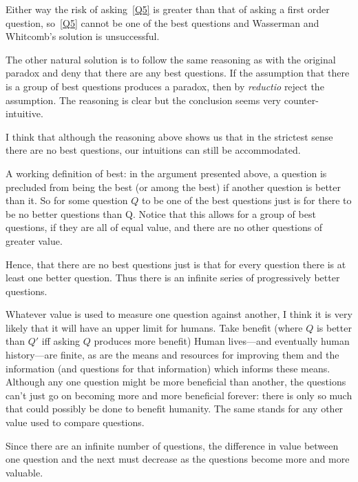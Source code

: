Either way the risk of asking~\ref{Q5} is greater than that of asking a first order question, so~\ref{Q5} cannot be one of the best questions and Wasserman and Whitcomb's solution is unsuccessful.

The other natural solution is to follow the same reasoning as with the original paradox and deny that there are any best questions.
If the assumption that there is a group of best questions produces a paradox, then by \textit{reductio} reject the assumption.
The reasoning is clear but the conclusion seems very counter-intuitive.

I think that although the reasoning above shows us that in the strictest sense there are no best questions, our intuitions can still be accommodated.

A working definition of best: in the argument presented above, a question is precluded from being the best (or among the best) if another question is better than it.
So for some question $Q$ to be one of the best questions just is for there to be no better questions than Q.
Notice that this allows for a group of best questions, if they are all of equal value, and there are no other questions of greater value.

Hence, that there are no best questions just is that for every question there is at least one better question.
Thus there is an infinite series of progressively better questions.

Whatever value is used to measure one question against another, I think it is very likely that it will have an upper limit for humans.
Take benefit (where $Q$ is better than $Q'$ iff asking $Q$ produces more benefit)
Human lives---and eventually human history---are finite, as are the means and resources for improving them and the information (and questions for that information) which informs these means.
Although any one question might be more beneficial than another, the questions can't just go on becoming more and more beneficial forever: there is only so much that could possibly be done to benefit humanity.
The same stands for any other value used to compare questions.

Since there are an infinite number of questions, the difference in value between one question and the next must decrease as the questions become more and more valuable.

